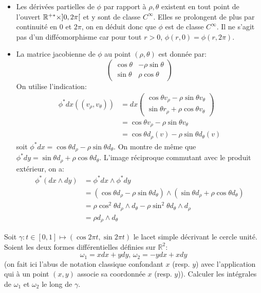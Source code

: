 \documentclass[a4paper, 12pt]{amsart}
\begin{document}
\begin{itemize}
\item Les dérivées partielles de $\phi$ par rapport à $\rho,\theta$ existent en tout point de l'ouvert $\mathbb{R}^{+*}\times ]0,2\pi[$ et y sont  de classe $C^\infty$. Elles se prolongent de plus par continuité en $0$ et $2 \pi$, on en déduit donc que $\phi$ est de classe $C^\infty$. Il ne s'agit pas d'un difféomorphisme car pour tout $r > 0$, $\phi(r,0)=\phi(r,2\pi)$. 
\item La matrice jacobienne de $\phi$ au point $(\rho,\theta)$ est donnée par:
\[
\left(
\begin{array}{cc}
\cos \theta & - \rho \sin \theta \\
\sin \theta & \rho \cos \theta
\end{array}\right)
\]
On utilise l'indication:
\begin{align*}
\phi^*dx((v_\rho,v_\theta)) &= dx\left(\begin{array}{c}
\cos \theta v_\rho - \rho \sin \theta v_\theta \\
\sin\theta r_\rho + \rho \cos \theta v_\theta 
\end{array} \right) \\
&= \cos \theta v_\rho - \rho \sin \theta v_\theta \\
&= \cos \theta d_\rho(v) - \rho \sin \theta  d_\theta(v)
\end{align*}
soit $\phi^*dx = \cos \theta d_\rho - \rho \sin \theta  d_\theta$.
On montre de même que  $\phi^*dy = \sin \theta d_\rho + \rho \cos \theta  d_\theta$.
L'image réciproque commutant avec le produit extérieur, on a:
\begin{align*}
\phi^*(dx \wedge dy) &= \phi^*dx \wedge \phi^*dy \\
&= (\cos \theta d_\rho - \rho \sin \theta  d_\theta) \wedge ( \sin \theta d_\rho + \rho \cos \theta d_\theta) \\
&= \rho \cos^2 \theta d_\rho \wedge d_\theta - \rho \sin^2 \theta d_\theta \wedge d_\rho \\
& = \rho d_\rho \wedge d_\theta 
\end{align*}
\end{itemize}
\begin{fex}
Soit $\gamma \colon t \in [0,1] \mapsto (\cos 2 \pi t, \sin 2 \pi t)$ le lacet
simple décrivant le cercle unité. Soient les deux formes différentielles
définies sur $\mathbb{R}^2$:
\[
\omega_1 =  x dx + y dy, \, \omega_2 = -y dx + x dy
\]
(on fait ici l'abus de notation classique confondant $x$ (resp. $y$) avec
l'application qui à un point $(x,y)$ associe sa coordonnée $x$ (resp. $y$)).
Calculer les intégrales de $\omega_1$ et $\omega_2$ le long de $\gamma$.
\end{fex}
\end{document}
